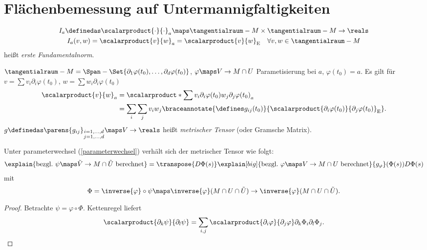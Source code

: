 \section{Flächenbemessung auf Untermannigfaltigkeiten}
\begin{definition*}
  \begin{gather*}
    I_a\definedas \scalarproduct{\cdot}{\cdot}_a\maps \tangentialraum-{M}\times\tangentialraum-{M}\to \reals\\
    I_a(v,w)=\scalarproduct{v}{w}_{a}=\scalarproduct{v}{w}_{\text{E}}\quad \forall v,w\in \tangentialraum-{M}
  \end{gather*}
  heißt \emph{erste Fundamentalnorm}.
\end{definition*}
\begin{bemerkung*}
  \( \tangentialraum-{M}=\Span-{\Set{\partial_1 \varphi(t_0),\dotsc,\partial_d \varphi(t_0)}} \), \( \varphi\maps V\to M\cap U \) Parametisierung bei \( a \), \( \varphi(t_0)=a \). Es gilt für \( v=\sum v_i \partial_i \varphi(t_0) \), \( w=\sum w_i \partial_i \varphi(t_0) \)
  \begin{align*}
    \scalarproduct{v}{w}_{a}&=\scalarproduct*{\sum v_i \partial_i \varphi(t_0)}{w_j \partial_j \varphi(t_0)}_{a}\\
    &=\sum_{i}\sum_j v_i w_j \braceannotate{\defines g_{ij}(t_0)}{\scalarproduct{\partial_i \varphi(t_0)}{\partial_j \varphi(t_0)}_{\text{E}}}.
  \end{align*}
  \( g\definedas \parens{g_{ij}}_{\substack{i=1,\dotsc,d\\ j=1,\dotsc,d}}\maps V\to \reals \) heißt \emph{metrischer Tensor} (oder Gramsche Matrix).
\end{bemerkung*}
\begin{lemma}
   Unter parameterwechsel (\vgl \ref{parameterwechsel}) verhält sich der metrischer Tensor wie folgt:
   \begin{equation*}
     \explain{\text{bezgl.\ \( \psi\maps \tilde{V}\to M\cap \tilde{U} \) berechnet}}=\transpose{D\Phi(s)}\explain[big]{\text{bezgl.\ \( \varphi\maps V\to M\cap U \) berechnet}}{g_{\varphi}}(\Phi(s))D\Phi(s)
   \end{equation*}
   mit
   \begin{equation*}
    \Phi=\inverse{\varphi}\circ \psi\maps  \inverse{\varphi}(M\cap U\cap \tilde{U})\to \inverse{\varphi}(M\cap U\cap \tilde{U}).
   \end{equation*}
\end{lemma}
\begin{proof}
  Betrachte \( \psi=\varphi\circ \Phi \). Kettenregel liefert
  \begin{equation*}
    \scalarproduct{\partial_k \psi}{\partial_l \psi}=\sum_{i,j}\scalarproduct{\partial_i \varphi}{\partial_j \varphi}\partial_k \Phi_i\partial_l \Phi_j.
  \end{equation*}
\end{proof}
